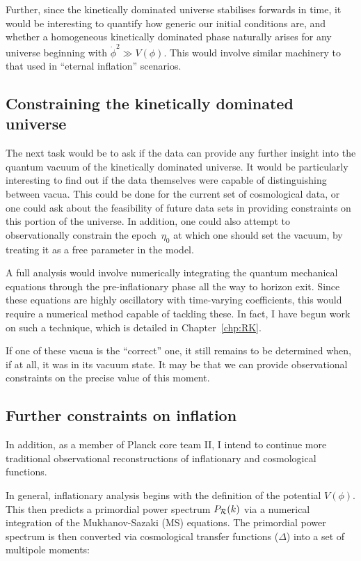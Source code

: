 Further, since the kinetically dominated universe stabilises forwards in time, it would be interesting to quantify how generic our initial conditions are, and whether a homogeneous kinetically dominated phase naturally arises for any universe beginning with \(\dot{\phi}^2\gg V(\phi)\). This would involve similar machinery to that used in ``eternal inflation'' scenarios.


\subsection*{Constraining the kinetically dominated universe}

The next task would be to ask if the data can provide any further insight into the quantum vacuum of the kinetically dominated universe. It would be particularly interesting to find out if the data themselves were capable of distinguishing between vacua. This could be done for the current set of cosmological data, or one could ask about the feasibility of future data sets in providing constraints on this portion of the universe. In addition, one could also attempt to observationally constrain the epoch~\(\eta_0\) at which one should set the vacuum, by treating it as a free parameter in the model.

A full analysis would involve numerically integrating the quantum mechanical equations through the pre-inflationary phase all the way to horizon exit. Since these equations are highly oscillatory with time-varying coefficients, this would require a numerical method capable of tackling these. In fact, I have begun work on such a technique, which is detailed in Chapter~\ref{chp:RK}.

If one of these vacua is the ``correct'' one, it still remains to be determined when, if at all, it was in its vacuum state. It may be that we can provide observational constraints on the precise value of this moment.

\subsection*{Further constraints on inflation}
In addition, as a member of Planck core team II, I intend to continue more traditional observational reconstructions of inflationary and cosmological functions.

In general, inflationary analysis begins with the definition of the potential \(V(\phi)\). This then predicts a primordial power spectrum \(P_\mathcal{R}(k)\) via a numerical integration of the Mukhanov-Sazaki (MS) equations. The primordial power spectrum is then converted via cosmological transfer functions (\(\Delta\)) into a set of multipole moments:

